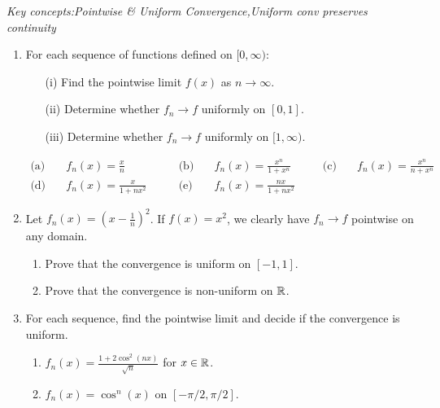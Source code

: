 \begin{exercises}
	\emph{Key concepts:\quad Pointwise \& Uniform Convergence,\quad Uniform conv preserves continuity}
	
	\begin{enumerate}
		\item\label{exs:uniform1} For each sequence of functions defined on $[0,\infty)$:
		\begin{enumerate}
	    \item[(i)] Find the pointwise limit $f(x)$ as $n\to\infty$.
	    \item[(ii)] Determine whether $f_n\to f$ uniformly on $[0,1]$.
	    \item[(iii)] Determine whether $f_n\to f$ uniformly on $[1,\infty)$.
	  \end{enumerate}\vspace{-12pt}
	  \begin{align*}
		  \text{(a)}&\quad f_n(x)=\frac xn\qquad 
		  &\text{(b)}&\quad f_n(x)=\frac{x^n}{1+x^n}\qquad
		  &\text{(c)}&\quad f_n(x)=\frac{x^n}{n+x^n}\\[4pt]
		  \text{(d)}&\quad f_n(x)=\frac x{1+nx^2}\qquad
		  &\text{(e)}&\quad f_n(x)=\frac{nx}{1+nx^2}
	  \end{align*}
	 	
	 	
	 	\item Let $f_n(x)=\left(x-\frac 1n\right)^2$. If $f(x)=x^2$, we clearly have $f_n\to f$ pointwise on any domain.
	 	\begin{enumerate}
	 	  \item Prove that the convergence is uniform on $[-1,1]$.
	 	  \item Prove that the convergence is non-uniform on $\mathbb{R}$.
	 	\end{enumerate}
	  
	  
	  \item For each sequence, find the pointwise limit and decide if the convergence is uniform.
	  \begin{enumerate}
	    \item $f_n(x)=\frac{1+2\cos^2(nx)}{\sqrt n}$ for $x\in\mathbb{R}$.
	    \item $f_n(x)=\cos^n(x)$ on $[-\pi/2,\pi/2]$.
	  \end{enumerate}
	 	

\end{enumerate}
\end{exercises}
